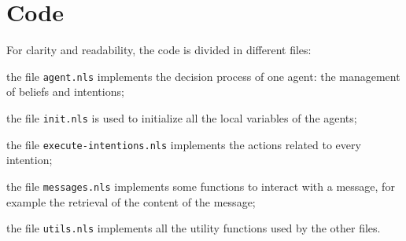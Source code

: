 \section{Code}

For clarity and readability, the code is divided in different files:
\begin{enumerate*}[label=(\roman*)]
\item the file \texttt{agent.nls} implements the decision process of one agent: the management of beliefs and intentions;
\item the file \texttt{init.nls} is used to initialize all the local variables of the agents;
\item the file \texttt{execute-intentions.nls} implements the actions related to every intention;
\item the file \texttt{messages.nls} implements some functions to interact with a message, for example the retrieval of the content of the message;
\item the file \texttt{utils.nls} implements all the utility functions used by the other files.
\end{enumerate*}
